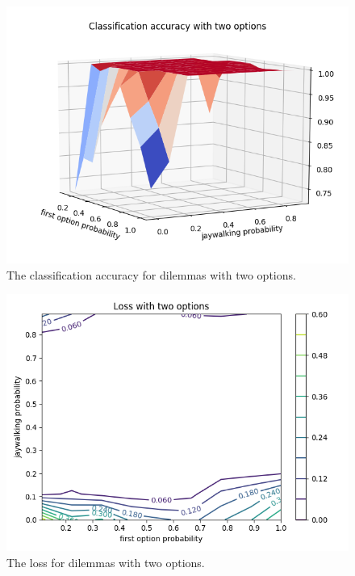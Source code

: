\documentclass{report}
\begin{document}
\begin{figure}[h]
    \centering
    \includegraphics[scale=0.5]{accuracy_with_two_options_surface_plot.png}
    \caption[]{The classification accuracy for dilemmas with two options.}
    \label{fig:accuracy_with_two_options_surface_plot}
\end{figure}

\begin{figure}[h]
    \centering
    \includegraphics[scale=0.5]{loss_with_two_options_contour_plot.png}
    \caption[]{The loss for dilemmas with two options.}
    \label{fig:loss_with_two_options_contour_plot}
\end{figure}
\end{document}
